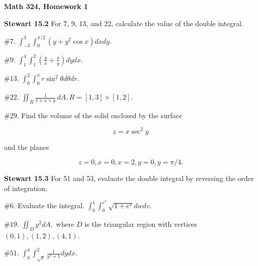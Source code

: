 \documentclass[11 pt]{report}
\begin{document}
\centerline{\bf Math 324, Homework 1}
%

\vspace{.2cm}

\noindent \textbf{Stewart 15.2} For 7, 9, 13, and 22, calculate the value of the double integral. 
 
\vspace{.2cm}

$\# 7.$ $\displaystyle{\int_{-3}^3 \int_0^{\pi/2} (y+y^2 \cos x) dx dy.}$

\vspace{.2cm}

$\# 9.$ $\displaystyle{\int_1^4 \int_1^2 (\frac{y}{x}+ \frac{x}{y}) dy dx.}$

\vspace{.2cm}

$\# 13.$ $\displaystyle{\int_0^2 \int_0^\pi r \sin^2 \theta d\theta dr.}$

\vspace{.2cm}

$\# 22.$ $\displaystyle{\iint_R \frac{1}{1+x+y} \,dA, R = [1,3] \times [1,2].}$

\vspace{.2cm}

$\# 29.$ Find the volume of the solid enclosed by the surface 

$$z = x \sec^2 y$$ 

and the planes 

$$z = 0, x = 0, x = 2, y = 0, y = \pi / 4.$$

\vspace{.3cm} 

\noindent \textbf{Stewart 15.3} For 51 and 53, evaluate the double integral by reversing the order of integration. 

\vspace{.2cm}

$\# 6.$ Evaluate the integral. $\displaystyle{\int_0^1 \int_0^{e^v} \sqrt{1+e^v} dw dv.}$

\vspace{.2cm} 

$\# 19.$ $\displaystyle{\iint_D y^2 dA,}$ where $D$ is the triangular region with vertices $(0,1), (1,2), (4,1)$. 

\vspace{.2cm}

$\# 51.$ $\displaystyle{\int_0^4 \int_{\sqrt{x}}^2 \frac{1}{y^3+1} dy dx.}$
\end{document}
